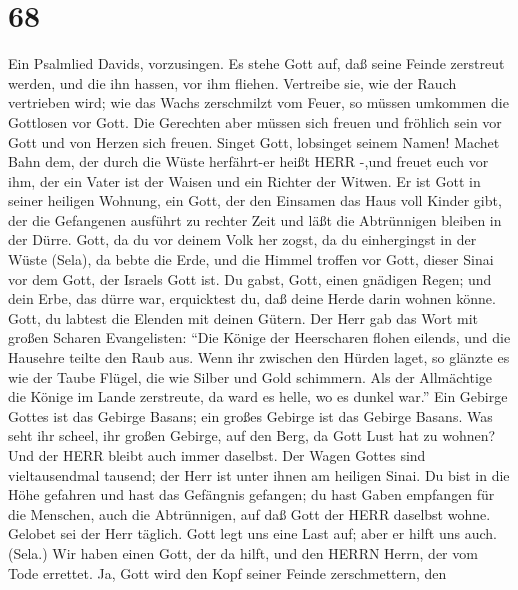 \hypertarget{section-67}{%
\section{68}\label{section-67}}

 Ein Psalmlied Davids, vorzusingen. Es stehe Gott auf, daß
seine Feinde zerstreut werden, und die ihn hassen, vor ihm fliehen.
 Vertreibe sie, wie der Rauch vertrieben wird; wie das Wachs
zerschmilzt vom Feuer, so müssen umkommen die Gottlosen vor Gott.
 Die Gerechten aber müssen sich freuen und fröhlich sein vor
Gott und von Herzen sich freuen.  Singet Gott, lobsinget
seinem Namen! Machet Bahn dem, der durch die Wüste herfährt-er heißt
HERR -,und freuet euch vor ihm,  der ein Vater ist der
Waisen und ein Richter der Witwen. Er ist Gott in seiner heiligen
Wohnung,  ein Gott, der den Einsamen das Haus voll Kinder
gibt, der die Gefangenen ausführt zu rechter Zeit und läßt die
Abtrünnigen bleiben in der Dürre.  Gott, da du vor deinem
Volk her zogst, da du einhergingst in der Wüste (Sela),  da
bebte die Erde, und die Himmel troffen vor Gott, dieser Sinai vor dem
Gott, der Israels Gott ist.  Du gabst, Gott, einen gnädigen
Regen; und dein Erbe, das dürre war, erquicktest du,  daß
deine Herde darin wohnen könne. Gott, du labtest die Elenden mit deinen
Gütern.  Der Herr gab das Wort mit großen Scharen
Evangelisten:  ``Die Könige der Heerscharen flohen eilends,
und die Hausehre teilte den Raub aus.  Wenn ihr zwischen
den Hürden laget, so glänzte es wie der Taube Flügel, die wie Silber und
Gold schimmern.  Als der Allmächtige die Könige im Lande
zerstreute, da ward es helle, wo es dunkel war.''  Ein
Gebirge Gottes ist das Gebirge Basans; ein großes Gebirge ist das
Gebirge Basans.  Was seht ihr scheel, ihr großen Gebirge,
auf den Berg, da Gott Lust hat zu wohnen? Und der HERR bleibt auch immer
daselbst.  Der Wagen Gottes sind vieltausendmal tausend;
der Herr ist unter ihnen am heiligen Sinai.  Du bist in die
Höhe gefahren und hast das Gefängnis gefangen; du hast Gaben empfangen
für die Menschen, auch die Abtrünnigen, auf daß Gott der HERR daselbst
wohne.  Gelobet sei der Herr täglich. Gott legt uns eine
Last auf; aber er hilft uns auch. (Sela.)  Wir haben einen
Gott, der da hilft, und den HERRN Herrn, der vom Tode errettet.
 Ja, Gott wird den Kopf seiner Feinde zerschmettern, den
